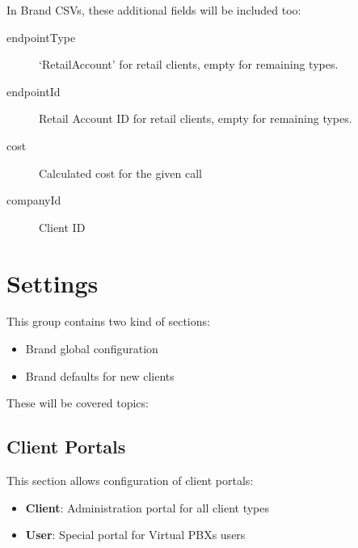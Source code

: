 \documentclass[letterpaper,10pt,english]{sphinxmanual}
\begin{document}
In Brand CSVs, these additional fields will be included too:
\begin{description}
\item[{endpointType}] \leavevmode{}\label{administration_portal/brand/calls/call_csv_schedulers:term-endpointtype}
`RetailAccount' for retail clients, empty for remaining types.

\item[{endpointId}] \leavevmode{}\label{administration_portal/brand/calls/call_csv_schedulers:term-endpointid}
Retail Account ID for retail clients, empty for remaining types.

\item[{cost}] \leavevmode{}\label{administration_portal/brand/calls/call_csv_schedulers:term-cost}
Calculated cost for the given call

\item[{companyId}] \leavevmode{}\label{administration_portal/brand/calls/call_csv_schedulers:term-companyid}
Client ID

\end{description}


\section{Settings}
\label{administration_portal/brand/settings/index::doc}\label{administration_portal/brand/settings/index:settings}
This group contains two kind of sections:
\begin{itemize}
\item {} 
Brand global configuration

\item {} 
Brand defaults for new clients

\end{itemize}

These will be covered topics:


\subsection{Client Portals}
\label{administration_portal/brand/settings/client_portals:client-portals}\label{administration_portal/brand/settings/client_portals::doc}\label{administration_portal/brand/settings/client_portals:id1}
This section allows configuration of client portals:
\begin{itemize}
\item {} 
\textbf{Client}: Administration portal for all client types

\item {} 
\textbf{User}: Special portal for Virtual PBXs users

\end{itemize}
\end{document}
